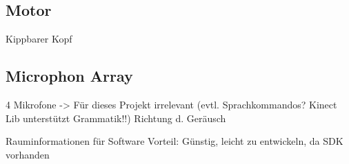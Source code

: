 	
\subsection{Motor}
	Kippbarer Kopf
	
	
\subsection{Microphon Array}
	4 Mikrofone -> Für dieses Projekt irrelevant 
	(evtl. Sprachkommandos? Kinect Lib unterstützt Grammatik!!)
	Richtung d. Geräusch
	
\cite{jana2012kinect}



Rauminformationen für Software
Vorteil: Günstig, leicht zu entwickeln, da SDK vorhanden